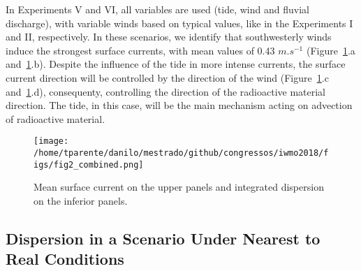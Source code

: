 \documentclass[final]{beamer}
\begin{document}
\begin{frame}
\begin{multicols}{2}
In Experiments V and VI, all variables are used (tide, wind and fluvial discharge), with
variable winds based on typical values, like in the Experiments I and II, respectively. 
In these scenarios, we identify that southwesterly winds induce the strongest surface
currents, with mean values of 0.43 $m.s^{-1}$ (Figure~\ref{fig:cenariosDispersao}.a 
and~\ref{fig:cenariosDispersao}.b). Despite the influence of the tide in more intense currents, 
the surface current direction will be controlled by the direction of the wind 
(Figure~\ref{fig:cenariosDispersao}.c and~\ref{fig:cenariosDispersao}.d), 
consequenty, controlling the direction of the radioactive material direction.
The tide, in this case, will be the main mechanism acting on advection of radioactive
material.

\begin{figure}
\centering
\texttt{[image: /home/tparente/danilo/mestrado/github/congressos/iwmo2018/figs/fig2\_combined.png]}
\caption{Mean surface current on the upper panels and integrated dispersion on the inferior panels.}
\label{fig:cenariosDispersao}
\end{figure}

\subsection{Dispersion in a Scenario Under Nearest to Real Conditions}





\end{multicols}
\end{frame}
\end{document}
